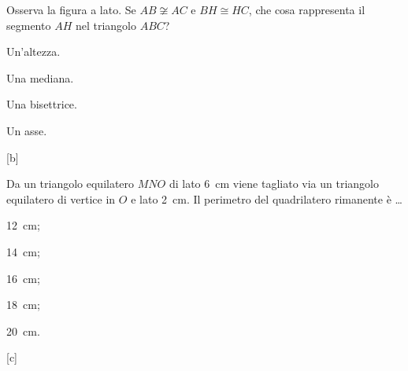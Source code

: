\begin{esercizio}
\label{ese:2.99}
Osserva la figura a lato. Se $AB\not\cong AC$ e $BH\cong HC$, che 
cosa rappresenta il segmento $AH$ nel triangolo $ABC$?\\
\begin{minipage}{.5\linewidth}
\begin{enumeratea}
\item Un'altezza.
\item Una mediana.
\item Una bisettrice.
\item Un asse.
\end{enumeratea}
\end{minipage}\hfil
\begin{minipage}{.2\linewidth}
  \centering
    
\end{minipage}
\hfill[b]
\end{esercizio}

\begin{esercizio}
\label{ese:2.100}
Da un triangolo equilatero $MNO$ di lato 6~cm viene tagliato via un 
triangolo equilatero di vertice in $O$ e lato 2~cm. Il perimetro del 
quadrilatero rimanente è \ldots
\begin{multicols}{5}
\begin{enumeratea}
\item 12~cm;
\item 14~cm;
\item 16~cm;
\item 18~cm;
\item 20~cm.
\end{enumeratea}
\end{multicols}
\hfill[c]
\end{esercizio}
